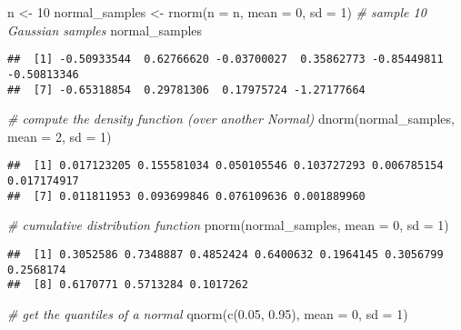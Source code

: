 \documentclass[
  oneside]{book}
\newenvironment{Shaded}{\begin{snugshade}}{\end{snugshade}}
\newcommand{\AttributeTok}[1]{\textcolor[rgb]{0.77,0.63,0.00}{#1}}
\newcommand{\CommentTok}[1]{\textcolor[rgb]{0.56,0.35,0.01}{\textit{#1}}}
\newcommand{\DecValTok}[1]{\textcolor[rgb]{0.00,0.00,0.81}{#1}}
\newcommand{\FloatTok}[1]{\textcolor[rgb]{0.00,0.00,0.81}{#1}}
\newcommand{\FunctionTok}[1]{\textcolor[rgb]{0.00,0.00,0.00}{#1}}
\newcommand{\NormalTok}[1]{#1}
\newcommand{\OtherTok}[1]{\textcolor[rgb]{0.56,0.35,0.01}{#1}}
\begin{document}
\begin{Shaded}
\begin{Highlighting}[]
\NormalTok{n }\OtherTok{\textless{}{-}} \DecValTok{10}
\NormalTok{normal\_samples }\OtherTok{\textless{}{-}} \FunctionTok{rnorm}\NormalTok{(}\AttributeTok{n =}\NormalTok{ n, }\AttributeTok{mean =} \DecValTok{0}\NormalTok{, }\AttributeTok{sd =} \DecValTok{1}\NormalTok{) }\CommentTok{\# sample 10 Gaussian samples}
\NormalTok{normal\_samples}
\end{Highlighting}
\end{Shaded}

\begin{verbatim}
##  [1] -0.50933544  0.62766620 -0.03700027  0.35862773 -0.85449811 -0.50813346
##  [7] -0.65318854  0.29781306  0.17975724 -1.27177664
\end{verbatim}

\begin{Shaded}
\begin{Highlighting}[]
\CommentTok{\# compute the density function (over another Normal)}
\FunctionTok{dnorm}\NormalTok{(normal\_samples, }\AttributeTok{mean =} \DecValTok{2}\NormalTok{, }\AttributeTok{sd =} \DecValTok{1}\NormalTok{)}
\end{Highlighting}
\end{Shaded}

\begin{verbatim}
##  [1] 0.017123205 0.155581034 0.050105546 0.103727293 0.006785154 0.017174917
##  [7] 0.011811953 0.093699846 0.076109636 0.001889960
\end{verbatim}

\begin{Shaded}
\begin{Highlighting}[]
\CommentTok{\# cumulative distribution function}
\FunctionTok{pnorm}\NormalTok{(normal\_samples, }\AttributeTok{mean =} \DecValTok{0}\NormalTok{, }\AttributeTok{sd =} \DecValTok{1}\NormalTok{)}
\end{Highlighting}
\end{Shaded}

\begin{verbatim}
##  [1] 0.3052586 0.7348887 0.4852424 0.6400632 0.1964145 0.3056799 0.2568174
##  [8] 0.6170771 0.5713284 0.1017262
\end{verbatim}

\begin{Shaded}
\begin{Highlighting}[]
\CommentTok{\# get the quantiles of a normal}
\FunctionTok{qnorm}\NormalTok{(}\FunctionTok{c}\NormalTok{(}\FloatTok{0.05}\NormalTok{, }\FloatTok{0.95}\NormalTok{), }\AttributeTok{mean =} \DecValTok{0}\NormalTok{, }\AttributeTok{sd =} \DecValTok{1}\NormalTok{)}
\end{Highlighting}
\end{Shaded}
\end{document}
